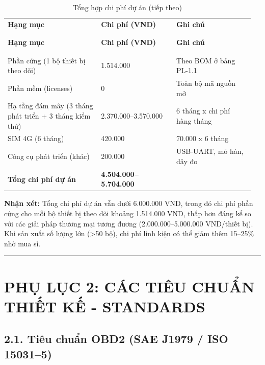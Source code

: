 \documentclass[a4paper]{extarticle}
\newcommand{\appendixsection}[1]{\clearpage\section{#1}}
\newcommand{\thesissettableid}[2]{%
  \renewcommand{\thetable}{#1}%
  \renewcommand{\theHtable}{#2}%
}
\begin{document}
{\thesissettableid{PL-1.3}{tab-app1-tong-hop-chi-phi-du-an}
\def\LTcaptype{table}
\begin{longtable}{|L{0.368\linewidth}|L{0.296\linewidth}|L{0.300\linewidth}|}
\caption{Tổng hợp chi phí dự án}\label{tab:app1-tong-hop-chi-phi-du-an}\\
\hline \textbf{Hạng mục} & \textbf{Chi phí (VND)} & \textbf{Ghi chú} \\
\\\hline
\endfirsthead
\caption[]{Tổng hợp chi phí dự án (tiếp theo)}\\
\hline \textbf{Hạng mục} & \textbf{Chi phí (VND)} & \textbf{Ghi chú} \\
\\\hline
\endhead
\\\hline
\endfoot
\endlastfoot
Phần cứng (1 bộ thiết bị theo dõi) & 1.514.000 & Theo BOM ở bảng PL-1.1 \\\hline
Phần mềm (licenses) & 0 & Toàn bộ mã nguồn mở \\\hline
Hạ tầng đám mây (3 tháng phát triển + 3 tháng kiểm thử) & 2.370.000--3.570.000 & 6
tháng x chi phí hàng tháng \\\hline
SIM 4G (6 tháng) & 420.000 & 70.000 x 6 tháng \\\hline
Công cụ phát triển (khác) & 200.000 & USB-UART, mỏ hàn, dây đo \\\hline
\textbf{Tổng chi phí dự án} & \textbf{4.504.000--5.704.000} & \\\hline
\end{longtable}
}


\textbf{Nhận xét:} Tổng chi phí dự án vẫn dưới 6.000.000 VND, trong đó
chi phí phần cứng cho mỗi bộ thiết bị theo dõi khoảng 1.514.000 VND, thấp hơn đáng
kể so với các giải pháp thương mại tương đương (2.000.000--5.000.000
VND/thiết bị). Khi sản xuất số lượng lớn (\textgreater50 bộ), chi phí
linh kiện có thể giảm thêm 15--25\% nhờ mua sỉ.

\begin{center}\rule{0.5\linewidth}{0.5pt}\end{center}

\appendixsection{PHỤ LỤC 2: CÁC TIÊU CHUẨN THIẾT KẾ -
STANDARDS}\label{phux1ee5-lux1ee5c-2-cuxe1c-tiuxeau-chuux1ea9n-thiux1ebft-kux1ebf---standards}

\subsection{2.1. Tiêu chuẩn OBD2 (SAE J1979 / ISO
15031--5)}\label{21-tiuxeau-chuux1ea9n-obd2-sae-j1979--iso-150315}
\end{document}
